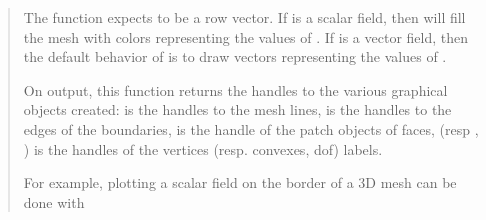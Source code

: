 \documentclass[a4paper,11pt,english]{sphinxmanual}
\begin{document}
\begin{quote}

The function expects  to be a row vector. If  is a scalar
field, then  will fill the mesh with colors
representing the values of . If  is a vector field, then
the default behavior of  is to draw vectors representing
the values of .

On output, this function returns the handles to the various
graphical objects created:  is the handles to the mesh
lines,  is the handles to the edges of the boundaries, 
is the handle of the patch objects of faces,  (resp
, ) is the handles of the vertices (resp. convexes,
dof) labels.

For example, plotting a scalar field on the border of a 3D mesh can be done with

\begin{sphinxVerbatim}[commandchars=\\\{\}]
 
   \PYGZsh{}      
      
\end{sphinxVerbatim}
\end{quote}
\end{document}

